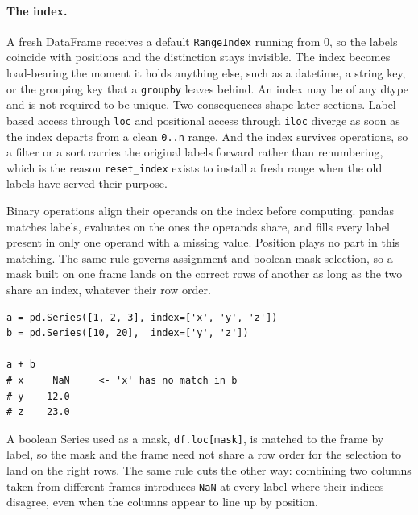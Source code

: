 \vspace{-2ex}

\paragraph{The index.} A fresh DataFrame receives a default \texttt{RangeIndex} running from 0, so the labels coincide with positions and the distinction stays invisible. The index becomes load-bearing the moment it holds anything else, such as a datetime, a string key, or the grouping key that a \texttt{groupby} leaves behind. An index may be of any dtype and is not required to be unique. Two consequences shape later sections. Label-based access through \texttt{loc} and positional access through \texttt{iloc} diverge as soon as the index departs from a clean \texttt{0..n} range. And the index survives operations, so a filter or a sort carries the original labels forward rather than renumbering, which is the reason \texttt{reset\_index} exists to install a fresh range when the old labels have served their purpose.

\vspace{1ex}

\begin{keybox}
Binary operations align their operands on the index before computing. pandas matches labels, evaluates on the ones the operands share, and fills every label present in only one operand with a missing value. Position plays no part in this matching. The same rule governs assignment and boolean-mask selection, so a mask built on one frame lands on the correct rows of another as long as the two share an index, whatever their row order.
\end{keybox}

\newpage

\begin{lstlisting}[style=python, caption={Addition aligns by label and fills the gaps}]
a = pd.Series([1, 2, 3], index=['x', 'y', 'z'])
b = pd.Series([10, 20],  index=['y', 'z'])

a + b
# x     NaN     <- 'x' has no match in b
# y    12.0
# z    23.0
\end{lstlisting}

\vspace{-1ex}

A boolean Series used as a mask, \texttt{df.loc[mask]}, is matched to the frame by label, so the mask and the frame need not share a row order for the selection to land on the right rows. The same rule cuts the other way: combining two columns taken from different frames introduces \texttt{NaN} at every label where their indices disagree, even when the columns appear to line up by position.

